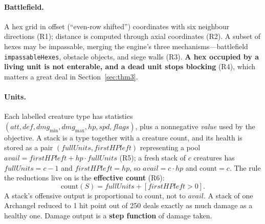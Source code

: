 \documentclass[11pt,a4paper]{article}
\theoremstyle{plain}
\theoremstyle{definition}
\theoremstyle{plain}
\theoremstyle{definition}
\theoremstyle{remark}
\newcommand{\src}[1]{\texttt{#1}}
\begin{document}
\paragraph{Battlefield.} A hex grid in offset (``even-row shifted'') coordinates with six
neighbour directions (R1); distance is computed through axial coordinates (R2). A subset of
hexes may be impassable, merging the engine's three mechanisms---battlefield
\src{impassableHexes}, obstacle objects, and siege walls (R3). \textbf{A hex occupied by a
living unit is not enterable, and a dead unit stops blocking} (R4), which matters a great deal
in Section~\ref{sec:thm3}.

\paragraph{Units.} Each labelled creature type has statistics
$(\mathit{att},\mathit{def},\mathit{dmg}_{\min},\mathit{dmg}_{\max},\mathit{hp},
\mathit{spd},\mathit{flags})$, plus a nonnegative \emph{value} used by the objective. A stack
is a type together with a creature count, and its health is stored as a pair
$(\mathit{fullUnits},\mathit{firstHPleft})$ representing a pool
$\mathit{avail}=\mathit{firstHPleft}+\mathit{hp}\cdot\mathit{fullUnits}$ (R5); a fresh stack of
$c$ creatures has $\mathit{fullUnits}=c-1$ and $\mathit{firstHPleft}=\mathit{hp}$, so
$\mathit{avail}=c\cdot\mathit{hp}$ and $\mathrm{count}=c$. The rule the
reductions live on is the \textbf{effective count} (R6):
\[
  \mathrm{count}(S)=\mathit{fullUnits}+[\mathit{firstHPleft}>0].
\]
A stack's offensive output is proportional to $\mathrm{count}$, not to $\mathit{avail}$. A
stack of one Archangel reduced to 1 hit point out of 250 deals exactly as much damage as a
healthy one. Damage output is a \textbf{step function} of damage taken.
\end{document}
